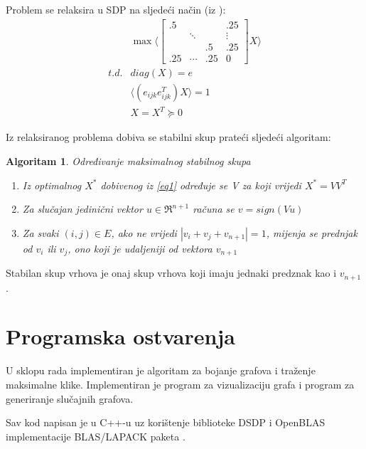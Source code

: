 \documentclass[diplomskirad]{fer}
\newtheorem{algoritam}{Algoritam}
\begin{document}
Problem se relaksira u SDP na sljedeći način (iz \cite{article}):
\begin{equation} \label{eq1}
  \begin{split}
    & \max \Biggl \langle \begin{bmatrix}
      .5 & & & .25 \\
      & \ddots &  & \vdots \\
      & & .5 & .25 \\
      .25 & \cdots & .25 & 0
    \end{bmatrix} X \Biggr \rangle \\
    t.d. & diag(X) = e \\
    &  \langle (e_{ijk} e_{ijk}^T) X \rangle = 1 \\
    & X = X^T \succeq 0 
  \end{split}
\end{equation}

Iz relaksiranog problema dobiva se stabilni skup prateći sljedeći algoritam:
\begin{algoritam} Određivanje maksimalnog stabilnog skupa
  \label{maks_clique}
  \begin{enumerate}
    \item Iz optimalnog $X^*$ dobivenog iz \ref{eq1} određuje se V za koji vrijedi $X^* = VV^T$
    \item Za slučajan jedinični vektor $u \in \Re^{n+1}$ računa se $v = sign(Vu)$
    \item Za svaki $(i,j) \in E$, ako ne vrijedi $|v_i+v_j+v_{n+1}| = 1$, mijenja se prednjak od $v_i$ ili $v_j$, ono koji je udaljeniji
        od vektora $v_{n+1}$
  \end{enumerate}
\end{algoritam}

Stabilan skup vrhova je onaj skup vrhova koji imaju jednaki predznak kao i $v_{n+1}$.

\chapter{Programska ostvarenja}
\label{pog:programska_ostvarenja}

U sklopu rada implementiran je algoritam za bojanje grafova i traženje maksimalne klike.
Implementiran je program za vizualizaciju grafa i program za generiranje slučajnih grafova.

Sav kod napisan je u C++-u uz korištenje biblioteke DSDP \cite{dsdp-user-guide} i OpenBLAS implementacije BLAS/LAPACK paketa \cite{openBLAS}.
\end{document}
